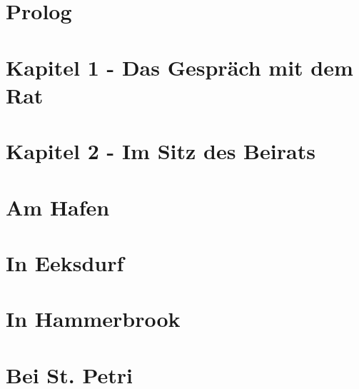 
\section{\textbf{Prolog}}


\section{\textbf{Kapitel 1 - Das Gespräch mit dem Rat}}


\section{\textbf{Kapitel 2 - Im Sitz des Beirats}}


\section{\textbf{Am Hafen}}
\label{Hafen}

\newpage

\section{\textbf{In Eeksdurf}}
\label{xd}

\newpage

\section{\textbf{In Hammerbrook}}
\label{arm}

\newpage

\section{\textbf{Bei St. Petri}}
\label{Petri}

\newpage

%
